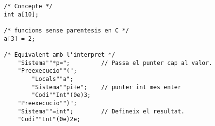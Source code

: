 \begin{lstlisting}[caption={Complex}, label=codi:complicat]
/* Concepte */
int a[10];

/* funcions sense parentesis en C */
a[3] = 2;

/* Equivalent amb l'interpret */
    "Sistema""*p=";         // Passa el punter cap al valor.
    "Preexecucio""(";
        "Locals""a";
        "Sistema""pi+e";    // punter int mes enter
        "Codi""Int"(0e)3;
    "Preexecucio"")";
    "Sistema""=int";        // Defineix el resultat.
    "Codi""Int"(0e)2e;
\end{lstlisting}